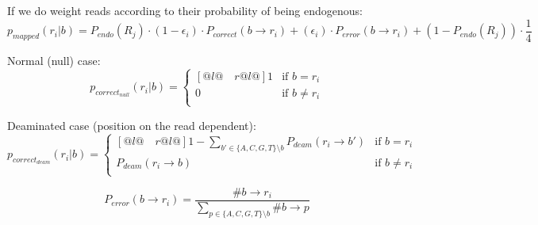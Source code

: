 \documentclass[a4paper,12pt]{article}
\begin{document}
\noindent If we do weight reads according to their probability of being endogenous:
\begin{equation}
  p_{mapped}(r_i|b)   = P_{endo}(R_j) \cdot (1-\epsilon_i ) \cdot  P_{correct}( b \to r_i) +  (\epsilon_i) \cdot P_{error}(  b \to r_i )   + (1-P_{endo}(R_j)) \cdot \frac {1} {4}
\end{equation} 


\noindent  Normal (null) case:
\begin{equation}
  p_{correct_{null}}(r_i|b)   = \begin{cases}[@{}l@{\quad}r@{}l@{}]
    1  &  \text{if }  b = r_i    \\
    0 &  \text{if }  b \ne r_i    \\
  \end{cases}
\end{equation} 

\noindent  Deaminated case (position on the read dependent):
\begin{equation}
  p_{correct_{deam}}(r_i|b)   = \begin{cases}[@{}l@{\quad}r@{}l@{}]
    1-\sum\limits_{b' \in \{ A,C,G,T \} \setminus b}   P_{deam}(r_i \to b')  &  \text{if }  b = r_i    \\
    P_{deam}(r_i \to b) &  \text{if }  b \ne r_i    \\
  \end{cases}
\end{equation} 


\begin{equation}
  P_{error}(  b \to r_i )  = \frac { \# b \to r_i } { \sum\limits_{p \in \{ A,C,G,T \} \setminus b } \# b \to p }
\end{equation}

\end{document}
